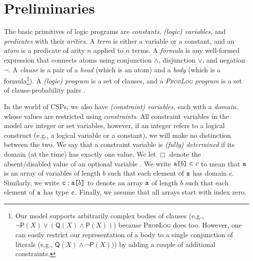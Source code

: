 \documentclass[runningheads]{llncs}
\newcommand{\variable}[1]{\texttt{\textup{#1}}}
\newcommand{\arrayd}[3]{\variable{{#1}[}{#2}\variable{]} \in {#3}}
\newcommand{\arrayt}[3]{\variable{{#3}} : \variable{{#1}[}{#2}\variable{]}}
\begin{document}
\section{Preliminaries}

The basic primitives of logic programs are \emph{constants}, \emph{(logic)
  variables}, and \emph{predicates} with their \emph{arities}. A \emph{term} is
either a variable or a constant, and an \emph{atom} is a predicate of arity $n$
applied to $n$ terms. A \emph{formula} is any well-formed expression that
connects atoms using conjunction $\land$, disjunction $\lor$, and negation
$\neg$. A \emph{clause} is a pair of a \emph{head} (which is an atom) and a
\emph{body} (which is a formula\footnote{Our model supports arbitrarily complex
  bodies of clauses (e.g., $\neg\mathsf{P}(X) \lor (\mathsf{Q}(X) \land
  \mathsf{P}(X))$) because \textsc{ProbLog} does too. However, one can easily
  restrict our representation of a body to a single conjunction of literals
  (e.g., $\mathsf{Q}(X) \land \neg\mathsf{P}(X))$) by adding a couple of
  additional constraints.}). A \emph{(logic) program} is a set of clauses, and a
\emph{\textsc{ProbLog} program} is a set of clause-probability pairs
\cite{DBLP:journals/tplp/FierensBRSGTJR15}.

In the world of CSPs, we also have \emph{(constraint) variables}, each with a
\emph{domain}, whose values are restricted using \emph{constraints}. All
constraint variables in the model are integer or set variables, however, if an
integer refers to a logical construct (e.g., a logical variable or a constant),
we will make no distinction between the two. We say that a constraint variable
is \emph{(fully) determined} if its domain (at the time) has exactly one value.
We let $\Box$ denote the absent/disabled value of an optional variable
\cite{DBLP:conf/cpaior/MearsSSTMW14}. We write $\arrayd{a}{b}{c}$ to mean that
$\variable{a}$ is an array of variables of length $b$ such that each element of
$\variable{a}$ has domain $c$. Similarly, we write $\arrayt{a}{b}{c}$ to denote
an array $\variable{a}$ of length $b$ such that each element of $\variable{a}$
has type $\variable{c}$. Finally, we assume that all arrays start with index
zero.
\end{document}
